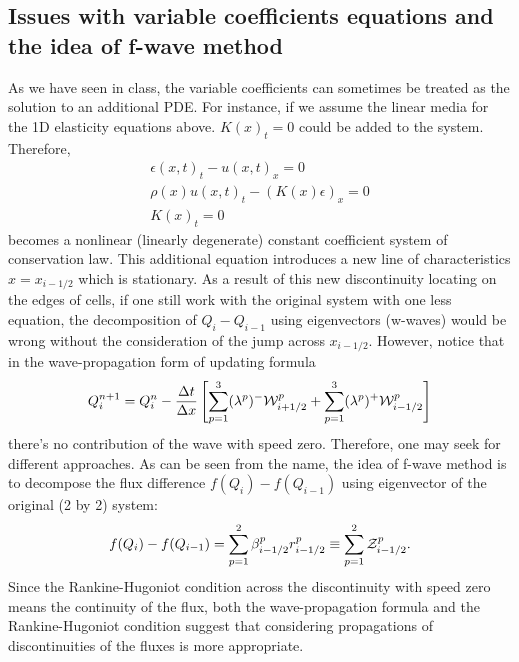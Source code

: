 \documentclass{article}
\begin{document}
\subsection{Issues with variable coefficients equations and the idea of f-wave method}
As we have seen in class, the variable coefficients can sometimes be treated as the solution to an additional PDE. For instance, if we assume the linear media for the 1D elasticity equations above. $K(x)_t=0$ could be added to the system. Therefore,
\begin{align*}
\epsilon(x,t)_t-u(x,t)_x=0 \\
\rho(x) u(x,t)_t-(K(x)\epsilon)_x=0 \\
K(x)_t=0
\end{align*}
becomes a nonlinear (linearly degenerate) constant coefficient system of conservation law. This additional equation introduces a new line of characteristics $x=x_{i-1/2}$ which is stationary. As a result of this new discontinuity locating on the edges of cells, if one still work with the original system with one less equation, the decomposition of $Q_i-Q_{i-1}$ using eigenvectors (w-waves) would be wrong without the consideration of the jump across $x_{i-1/2}$. However, notice that in the wave-propagation form of updating formula
\begin{align}
Q_i^{n+1}=Q_i^{n}-\frac{\Delta t}{\Delta x}\left[\sum_{p=1}^{3} (\lambda^p)^-{\cal W}_{i+1/2}^p+\sum_{p=1}^{3} (\lambda^p)^+ {\cal W}_{i-1/2}^p\right]
\end{align}
there's no contribution of the wave with speed zero. Therefore, one may seek for different approaches. As can be seen from the name, the idea of f-wave method is to decompose the flux difference $f(Q_i)-f(Q_{i-1})$ using eigenvector of the original (2 by 2) system:
\begin{align}
f(Q_i)-f(Q_{i-1})=\sum_{p=1}^{2} \beta^p_{i-1/2} r^p_{i-1/2}\equiv \sum_{p=1}^{2} {\cal Z}^p_{i-1/2}.
\end{align}
Since the Rankine-Hugoniot condition across the discontinuity with speed zero means the continuity of the flux, both the wave-propagation formula and the Rankine-Hugoniot condition suggest that considering propagations of discontinuities of the fluxes is more appropriate.
\end{document}
